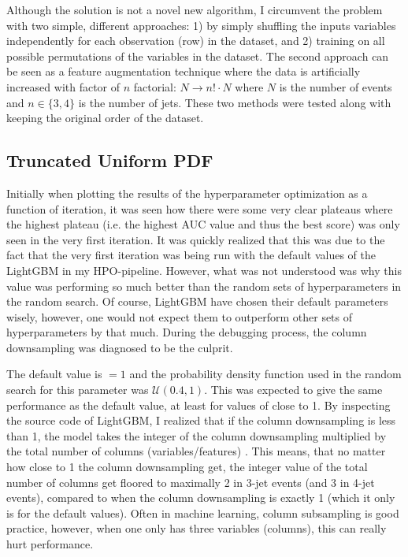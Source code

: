 Although the solution is not a novel new algorithm, I circumvent the problem with two simple, different approaches: 1) by simply shuffling the inputs variables independently for each observation (row) in the dataset, and 2) training on all possible permutations of the variables in the dataset. The second approach can be seen as a feature augmentation technique where the data is artificially increased with factor of $n$ factorial: $N \rightarrow n!\cdot N$ where $N$ is the number of events and $n\in \{3, 4\}$ is the number of jets. These two methods were tested along with keeping the original order of the dataset. 


\subsection{Truncated Uniform PDF}
\label{subsec:q:trunc_uniform}

Initially when plotting the results of the hyperparameter optimization as a function of iteration, it was seen how there were some very clear plateaus where the highest plateau (i.e. the highest AUC value and thus the best score) was only seen in the very first iteration. It was quickly realized that this was due to the fact that the very first iteration was being run with the default values of the LightGBM in my HPO-pipeline. However, what was not understood was why this value was performing so much better than the random sets of hyperparameters in the random search. Of course, LightGBM have chosen their default parameters wisely, however, one would not expect them to outperform other sets of hyperparameters by that much. During the debugging process, the column downsampling  was diagnosed to be the culprit. 

The default value is $=1$ and the probability density function used in the random search for this parameter was $\mathcal{U}(0.4, 1)$. This was expected to give the same performance as the default value, at least for values of  close to \num{1}. By inspecting the source code of LightGBM, I realized that if the column downsampling is less than \num{1}, the model takes the integer of the column downsampling multiplied by the total number of columns (variables/features) \autocite{MicrosoftLightGBM}. This means, that no matter how close to \num{1} the column downsampling get, the integer value of the total number of columns get floored to {maximally} \num{2} in 3-jet events (and \num{3} in 4-jet events), compared to when the column downsampling is exactly \num{1} (which it only is for the default values). Often in machine learning, column subsampling is good practice, however, when one only has three variables (columns), this can really hurt performance.

